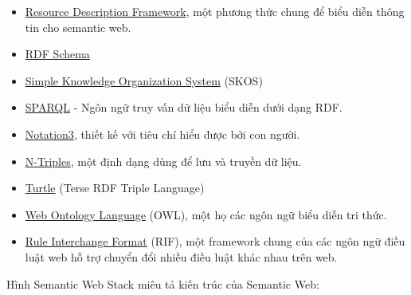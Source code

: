 \begin{itemize}
	\item \href{http://en.wikipedia.org/wiki/Resource\_Description\_Framework}{Resource Description Framework}, một phương thức chung để biểu diễn thông tin cho semantic web.
	\item \href{http://en.wikipedia.org/wiki/RDF_Schema}{RDF Schema}
	\item \href{http://en.wikipedia.org/wiki/Simple_Knowledge_Organization_System}{Simple Knowledge Organization System} (SKOS)
	\item \href{http://en.wikipedia.org/wiki/SPARQL}{SPARQL} - Ngôn ngữ truy vấn dữ liệu biểu diễn dưới dạng RDF.
	\item \href{http://en.wikipedia.org/wiki/Notation3}{Notation3}, thiết kế với tiêu chí hiểu được bởi con người.
	\item \href{http://en.wikipedia.org/wiki/N-Triples}{N-Triples}, một định dạng dùng để lưu và truyền dữ liệu.
	\item \href{http://en.wikipedia.org/wiki/Turtle_(syntax)}{Turtle} (Terse RDF Triple Language)
	\item \href{http://en.wikipedia.org/wiki/Web_Ontology_Language}{Web Ontology Language} (OWL), một họ các ngôn ngữ biểu diễn tri thức.
	\item \href{}{Rule Interchange Format} (RIF), một framework chung của các ngôn ngữ điều luật web hỗ trợ chuyển đổi nhiều điều luật khác nhau trên web.
\end{itemize}

Hình Semantic Web Stack \cite{semantic3} miêu tả kiến trúc của Semantic Web:

